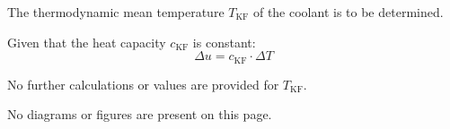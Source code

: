 The thermodynamic mean temperature \( T_{\text{KF}} \) of the coolant is to be determined.  

Given that the heat capacity \( c_{\text{KF}} \) is constant:  
\[
\Delta u = c_{\text{KF}} \cdot \Delta T
\]  

No further calculations or values are provided for \( T_{\text{KF}} \).  

No diagrams or figures are present on this page.